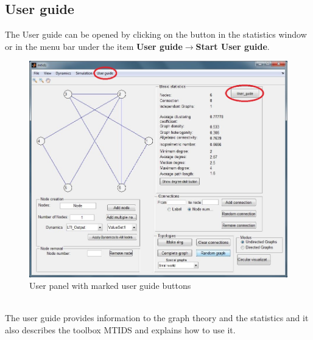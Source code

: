 \documentclass[12pt]{report}
\begin{document}
\subsection{User guide}
The User guide can be opened by clicking on the button in the statistics window or in the menu bar under the item \textbf{User guide$\rightarrow$Start User guide}.\\
\begin{figure}[h]
\centering
\includegraphics[scale=.5]{user_panela_ug}
\caption{User panel with marked user guide buttons}
\label{FIG:abb23}
\end{figure}
\\
The user guide provides information to the graph theory and the statistics and it also describes the toolbox MTIDS and explains how to use it.\\
\\
\end{document}
